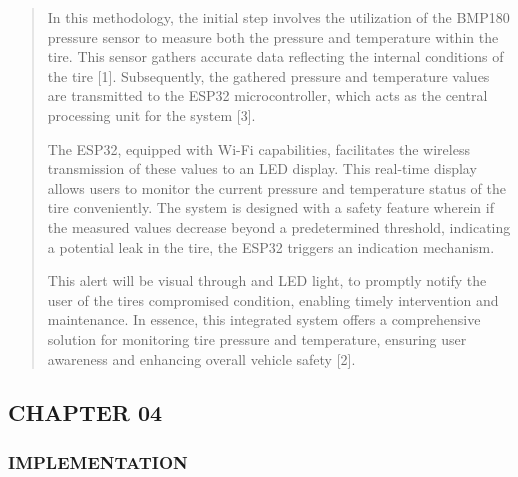 \documentclass[
]{article}
\begin{document}
\begin{quote}
In this methodology, the initial step involves the utilization of the
BMP180 pressure sensor to measure both the pressure and temperature
within the tire. This sensor gathers accurate data reflecting the
internal conditions of the tire {[}1{]}. Subsequently, the gathered
pressure and temperature values are transmitted to the ESP32
microcontroller, which acts as the central processing unit for the
system {[}3{]}.

The ESP32, equipped with Wi-Fi capabilities, facilitates the wireless
transmission of these values to an LED display. This real-time display
allows users to monitor the current pressure and temperature status of
the tire conveniently. The system is designed with a safety feature
wherein if the measured values decrease beyond a predetermined
threshold, indicating a potential leak in the tire, the ESP32 triggers
an indication mechanism.

This alert will be visual through and LED light, to promptly notify the
user of the tire\textquotesingle s compromised condition, enabling
timely intervention and maintenance. In essence, this integrated system
offers a comprehensive solution for monitoring tire pressure and
temperature, ensuring user awareness and enhancing overall vehicle
safety {[}2{]}\protect\hypertarget{_bookmark15}{}{}.
\end{quote}
\newpage
\hypertarget{chapter-04}{%
\subsection{CHAPTER 04}\label{chapter-04}}

\hypertarget{implementation}{%
\subsubsection{IMPLEMENTATION}\label{implementation}}
\end{document}
